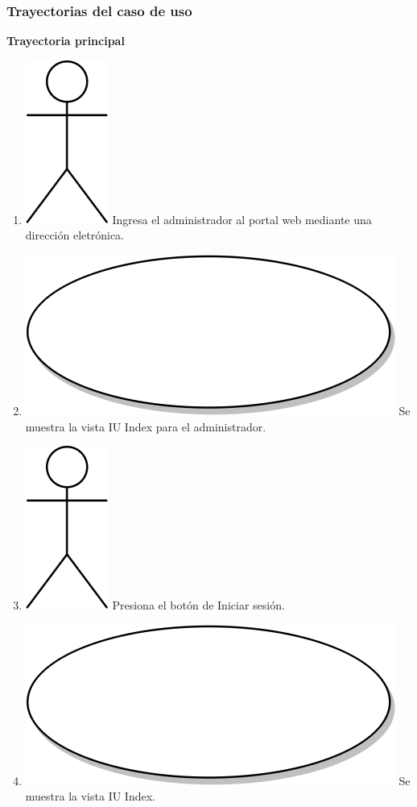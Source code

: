 \subsubsection{Trayectorias del caso de uso}
\textbf{Trayectoria principal}
\begin{enumerate}
  \item {\includegraphics[scale=.1]{Capitulo3/img/actor.png} Ingresa el administrador al portal web mediante una dirección eletrónica.}
  \item {\includegraphics[scale=.05]{Capitulo3/img/proceso.png} Se muestra la vista IU Index para el administrador.}
  \item {\includegraphics[scale=.1]{Capitulo3/img/actor.png} Presiona el botón de Iniciar sesión.}
  \item {\includegraphics[scale=.05]{Capitulo3/img/proceso.png} Se muestra la vista IU Index.}

\end{enumerate}
